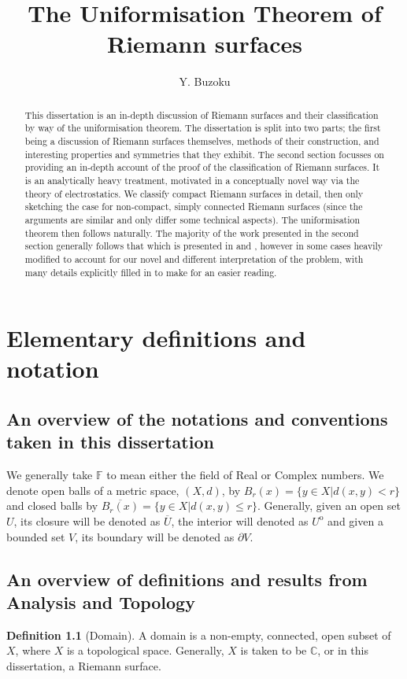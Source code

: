 \documentclass[11pt]{report}
\title{The Uniformisation Theorem of Riemann surfaces}
\author{Y. Buzoku}
\theoremstyle{definition}
\newtheorem{defn}[thm]{Definition}
\begin{document}
\maketitle
\tableofcontents

\newpage
\begin{abstract}
This dissertation is an in-depth discussion of Riemann surfaces and their classification by way of the uniformisation theorem. The dissertation is split into two parts; the first being a discussion of Riemann surfaces themselves, methods of their construction, and interesting properties and symmetries that they exhibit. The second section focusses on providing an in-depth account of the proof of the classification of Riemann surfaces. It is an analytically heavy treatment, motivated in a conceptually novel way via the theory of electrostatics. We classify compact Riemann surfaces in detail, then only sketching the case for non-compact, simply connected Riemann surfaces (since the arguments are similar and only differ some technical aspects). The uniformisation theorem then follows naturally. The majority of the work presented in the second section generally follows that which is presented in \cite{donaldson} and \cite{notes}, however in some cases heavily modified to account for our novel and different interpretation of the problem, with many details explicitly filled in to make for an easier reading. 
\end{abstract}
\declaration %



\chapter{Elementary definitions and notation}
\section{An overview of the notations and conventions taken in this dissertation}
We generally take $\mathbb{F}$ to mean either the field of Real or Complex numbers.
We denote open balls of a metric space, $(X,d)$, by $B_r(x) = \{y \in X \vert d(x,y) < r\}$ and closed balls by $\overline{B_r(x)} = \{y \in X \vert d(x,y) \leq r\}$. Generally, given an open set $U$, its closure will be denoted as $\overline{U}$, the interior will denoted as $U^{\mathrm{o}}$ and given a bounded set $V$, its boundary will be denoted as $\partial V$.
\section{An overview of definitions and results from Analysis and Topology}
\begin{defn}[Domain]
  A domain is a non-empty, connected, open subset of $X$, where $X$ is a topological space. Generally, $X$ is taken to be $\mathbb{C}$, or in this dissertation, a Riemann surface.
\end{defn}
\end{document}

